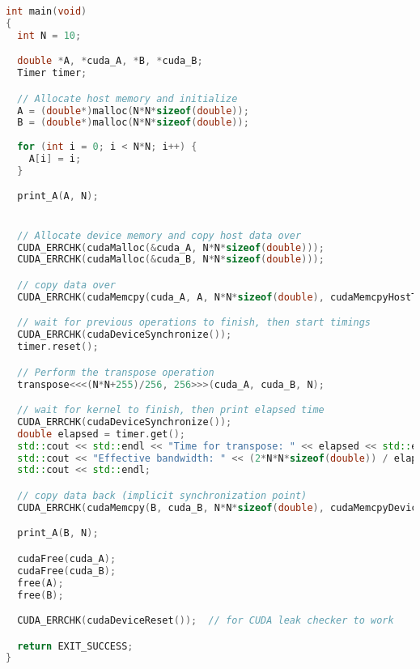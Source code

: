 \begin{appendix}
\begin{lstlisting}[language=C++, title=C++ Listing for EX2 b and c]
int main(void)
{
  int N = 10;

  double *A, *cuda_A, *B, *cuda_B;
  Timer timer;

  // Allocate host memory and initialize
  A = (double*)malloc(N*N*sizeof(double));
  B = (double*)malloc(N*N*sizeof(double));
  
  for (int i = 0; i < N*N; i++) {
    A[i] = i;
  }

  print_A(A, N);


  // Allocate device memory and copy host data over
  CUDA_ERRCHK(cudaMalloc(&cuda_A, N*N*sizeof(double))); 
  CUDA_ERRCHK(cudaMalloc(&cuda_B, N*N*sizeof(double))); 

  // copy data over
  CUDA_ERRCHK(cudaMemcpy(cuda_A, A, N*N*sizeof(double), cudaMemcpyHostToDevice));

  // wait for previous operations to finish, then start timings
  CUDA_ERRCHK(cudaDeviceSynchronize());
  timer.reset();

  // Perform the transpose operation
  transpose<<<(N*N+255)/256, 256>>>(cuda_A, cuda_B, N);

  // wait for kernel to finish, then print elapsed time
  CUDA_ERRCHK(cudaDeviceSynchronize());
  double elapsed = timer.get();
  std::cout << std::endl << "Time for transpose: " << elapsed << std::endl;
  std::cout << "Effective bandwidth: " << (2*N*N*sizeof(double)) / elapsed * 1e-9 << " GB/sec" << std::endl;
  std::cout << std::endl;

  // copy data back (implicit synchronization point)
  CUDA_ERRCHK(cudaMemcpy(B, cuda_B, N*N*sizeof(double), cudaMemcpyDeviceToHost));

  print_A(B, N);

  cudaFree(cuda_A);
  cudaFree(cuda_B);
  free(A);
  free(B);

  CUDA_ERRCHK(cudaDeviceReset());  // for CUDA leak checker to work

  return EXIT_SUCCESS;
}
\end{lstlisting}


\end{appendix}

